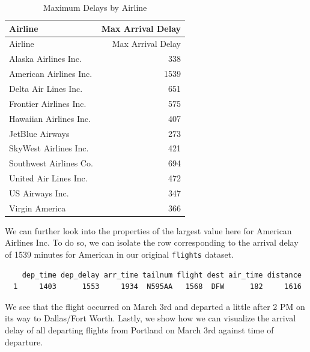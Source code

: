 \documentclass[12pt,twoside]{reedthesis}
\begin{document}
  \begin{longtable}[c]{@{}lr@{}}
  \caption{Maximum Delays by Airline \label{tab:max_delay}}\tabularnewline
  \toprule
  Airline & Max Arrival Delay\tabularnewline
  \midrule
  \endfirsthead
  \toprule
  Airline & Max Arrival Delay\tabularnewline
  \midrule
  \endhead
  Alaska Airlines Inc. & 338\tabularnewline
  American Airlines Inc. & 1539\tabularnewline
  Delta Air Lines Inc. & 651\tabularnewline
  Frontier Airlines Inc. & 575\tabularnewline
  Hawaiian Airlines Inc. & 407\tabularnewline
  JetBlue Airways & 273\tabularnewline
  SkyWest Airlines Inc. & 421\tabularnewline
  Southwest Airlines Co. & 694\tabularnewline
  United Air Lines Inc. & 472\tabularnewline
  US Airways Inc. & 347\tabularnewline
  Virgin America & 366\tabularnewline
  \bottomrule
  \end{longtable}
  
  We can further look into the properties of the largest value here for
  American Airlines Inc. To do so, we can isolate the row corresponding to
  the arrival delay of 1539 minutes for American in our original
  \texttt{flights} dataset.
  
  \begin{Shaded}
  \end{Shaded}
  
  \begin{verbatim}
    dep_time dep_delay arr_time tailnum flight dest air_time distance
  1     1403      1553     1934  N595AA   1568  DFW      182     1616
  \end{verbatim}
  
  We see that the flight occurred on March 3rd and departed a little after
  2 PM on its way to Dallas/Fort Worth. Lastly, we show how we can
  visualize the arrival delay of all departing flights from Portland on
  March 3rd against time of departure.
  
  \begin{Shaded}
  \end{Shaded}
  
\end{document}
